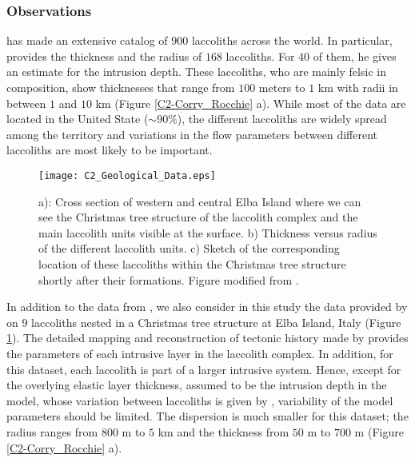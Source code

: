 \subsubsection*{Observations}

\citet{E:2015tl}  has made  an extensive  catalog of  $900$ laccoliths
across  the  world.   In  particular,  \citet{E:2015tl}  provides  the
thickness and  the radius of $168$  laccoliths.  For $40$ of  them, he
gives an estimate for the  intrusion depth.  These laccoliths, who are
mainly felsic in  composition, show thicknesses that  range from $100$
meters  to $1$  km  with radii  in  between $1$  and  $10$ km  (Figure
\ref{C2-Corry_Rocchie} a).  While most of  the data are located in the
United State ($\sim 90\%$), the different laccoliths are widely spread
among  the territory  and variations  in the  flow parameters  between
different laccoliths are most likely to be important.
\begin{figure}[h!]
  \begin{center}
    \graphicspath{ {/Users/thorey/Documents/These/Manuscript/Figure/Chapter2/} }
    \texttt{[image: C2\_Geological\_Data.eps]}
    \caption{a):  Cross section  of  western and  central Elba  Island
      where we can  see the Christmas tree structure  of the laccolith
      complex and the main laccolith  units visible at the surface. b)
      Thickness  versus radius  of the  different laccolith  units. c)
      Sketch of the corresponding  location of these laccoliths within
      the    Christmas   tree    structure    shortly   after    their
      formations. Figure modified from \citet{Rocchi:2002jy}.}
    \label{C2_Geological_Data}
  \end{center}
\end{figure}

In addition  to the  data from \citet{E:2015tl},  we also  consider in
this  study   the  data  provided  by   \citet{Rocchi:2002jy}  on  $9$
laccoliths nested in a Christmas  tree structure at Elba Island, Italy
(Figure   \ref{C2_Geological_Data}).    The   detailed   mapping   and
reconstruction  of  tectonic  history  made  by  \citet{Rocchi:2002jy}
provides  the parameters  of  each intrusive  layer  in the  laccolith
complex. In  addition, for this dataset,  each laccolith is part  of a
larger intrusive system. Hence, except for the overlying elastic layer
thickness,  assumed to  be the  intrusion  depth in  the model,  whose
variation  between  laccoliths   is  given  by  \citet{Rocchi:2002jy},
variability of the model parameters should be limited.  The dispersion
is much  smaller for this dataset;  the radius ranges from  $800$ m to
$5$  km   and  the  thickness   from  $50$   m  to  $700$   m  (Figure
\ref{C2-Corry_Rocchie} a).

